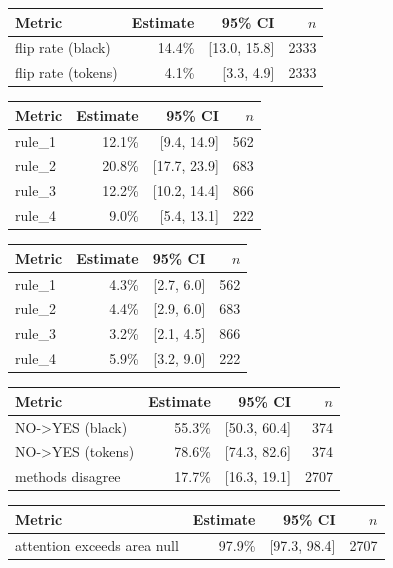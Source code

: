 \begin{tabular}{lrrr}
\toprule
Metric & Estimate & 95\% CI & $n$ \\
\midrule
flip rate (black) & 14.4\% & [13.0, 15.8] & 2333 \\
flip rate (tokens) & 4.1\% & [3.3, 4.9] & 2333 \\
\bottomrule
\end{tabular}

\begin{tabular}{lrrr}
\toprule
Metric & Estimate & 95\% CI & $n$ \\
\midrule
rule\_1 & 12.1\% & [9.4, 14.9] & 562 \\
rule\_2 & 20.8\% & [17.7, 23.9] & 683 \\
rule\_3 & 12.2\% & [10.2, 14.4] & 866 \\
rule\_4 & 9.0\% & [5.4, 13.1] & 222 \\
\bottomrule
\end{tabular}

\begin{tabular}{lrrr}
\toprule
Metric & Estimate & 95\% CI & $n$ \\
\midrule
rule\_1 & 4.3\% & [2.7, 6.0] & 562 \\
rule\_2 & 4.4\% & [2.9, 6.0] & 683 \\
rule\_3 & 3.2\% & [2.1, 4.5] & 866 \\
rule\_4 & 5.9\% & [3.2, 9.0] & 222 \\
\bottomrule
\end{tabular}

\begin{tabular}{lrrr}
\toprule
Metric & Estimate & 95\% CI & $n$ \\
\midrule
NO->YES (black) & 55.3\% & [50.3, 60.4] & 374 \\
NO->YES (tokens) & 78.6\% & [74.3, 82.6] & 374 \\
methods disagree & 17.7\% & [16.3, 19.1] & 2707 \\
\bottomrule
\end{tabular}

\begin{tabular}{lrrr}
\toprule
Metric & Estimate & 95\% CI & $n$ \\
\midrule
attention exceeds area null & 97.9\% & [97.3, 98.4] & 2707 \\
\bottomrule
\end{tabular}

